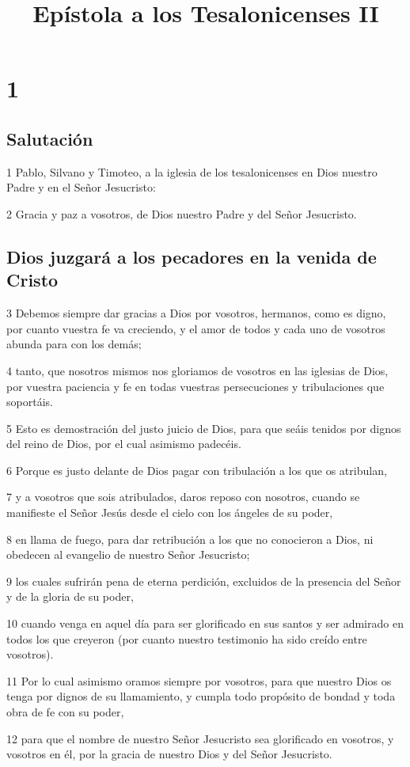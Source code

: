 
\title{Epístola a los Tesalonicenses II}

\chapter{1}

\section*{Salutación}

\par 1 Pablo, Silvano y Timoteo, a la iglesia de los tesalonicenses en Dios nuestro Padre y en el Señor Jesucristo:
\par 2 Gracia y paz a vosotros, de Dios nuestro Padre y del Señor Jesucristo.

\section*{Dios juzgará a los pecadores en la venida de Cristo}

\par 3 Debemos siempre dar gracias a Dios por vosotros, hermanos, como es digno, por cuanto vuestra fe va creciendo, y el amor de todos y cada uno de vosotros abunda para con los demás;
\par 4 tanto, que nosotros mismos nos gloriamos de vosotros en las iglesias de Dios, por vuestra paciencia y fe en todas vuestras persecuciones y tribulaciones que soportáis.
\par 5 Esto es demostración del justo juicio de Dios, para que seáis tenidos por dignos del reino de Dios, por el cual asimismo padecéis.
\par 6 Porque es justo delante de Dios pagar con tribulación a los que os atribulan,
\par 7 y a vosotros que sois atribulados, daros reposo con nosotros, cuando se manifieste el Señor Jesús desde el cielo con los ángeles de su poder,
\par 8 en llama de fuego, para dar retribución a los que no conocieron a Dios, ni obedecen al evangelio de nuestro Señor Jesucristo;
\par 9 los cuales sufrirán pena de eterna perdición, excluidos de la presencia del Señor y de la gloria de su poder,
\par 10 cuando venga en aquel día para ser glorificado en sus santos y ser admirado en todos los que creyeron (por cuanto nuestro testimonio ha sido creído entre vosotros).
\par 11 Por lo cual asimismo oramos siempre por vosotros, para que nuestro Dios os tenga por dignos de su llamamiento, y cumpla todo propósito de bondad y toda obra de fe con su poder,
\par 12 para que el nombre de nuestro Señor Jesucristo sea glorificado en vosotros, y vosotros en él, por la gracia de nuestro Dios y del Señor Jesucristo.

